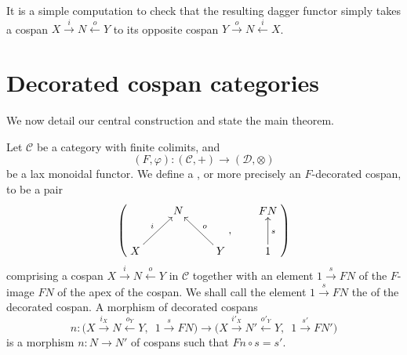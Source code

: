 \begin{example}
  It is a simple computation to check that the resulting dagger functor simply
  takes a cospan $X \stackrel{i}{\longrightarrow} N \stackrel{o}{\longleftarrow}
  Y$ to its opposite cospan $Y \stackrel{o}{\longrightarrow} N
  \stackrel{i}{\longleftarrow} X$.
\end{example}

\section{Decorated cospan categories} \label{sec:dcc}

We now detail our central construction and state the main theorem.
\begin{definition} \label{def:fcospans}
  Let $\mathcal C$ be a category with finite colimits, and
  \[
    (F,\varphi)\colon  (\mathcal C,+) \longrightarrow (\mathcal D, \otimes)
  \]
  be a lax monoidal functor. We define a , or more
  precisely an $F$-decorated cospan, to be a pair 
  \[
    \left(
    \begin{aligned}
      \xymatrix{
	& N \\  
	X \ar[ur]^{i} && Y \ar[ul]_{o}
      }
    \end{aligned}
    ,
    \qquad
    \begin{aligned}
      \xymatrix{
	FN \\
	1 \ar[u]_{s}
      }
    \end{aligned}
    \right)
  \]
  comprising a cospan $X \stackrel{i}\rightarrow N \stackrel{o}\leftarrow Y$ in
  $\mathcal C$ together with an element $1 \stackrel{s}\rightarrow FN$ of
  the $F$-image $FN$ of the apex of the cospan. We shall call the element $1
  \stackrel{s}\rightarrow FN$ the  of the decorated
  cospan. A morphism of decorated cospans 
  \[
    n\colon  \big(X \stackrel{i_X}\longrightarrow N \stackrel{o_Y}\longleftarrow
    Y,\enspace 1 \stackrel{s}\longrightarrow FN\big) \longrightarrow \big(X
    \stackrel{i'_X}\longrightarrow N' \stackrel{o'_Y}\longleftarrow Y,\enspace 1
    \stackrel{s'}\longrightarrow FN'\big)
  \]
  is a morphism $n\colon  N \to N'$ of cospans such that $Fn \circ s = s'$.
\end{definition}

